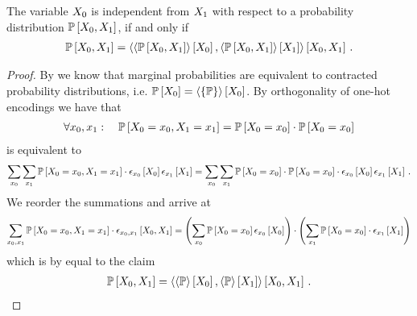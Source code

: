 \begin{theorem}
    \label{the:independenceProductCriterion}
    The variable $X_{0}$ is independent from $X_{1}$ with respect to a probability distribution $\mathbb{P}\left[X_{0},X_{1}\right]$, if and only if
    \begin{align*}
        \mathbb{P}\left[X_{0},X_{1}\right]
        = \left\langle \left\langle \mathbb{P}\left[X_{0},X_{1}\right]\right\rangle \left[ X_{0} \right],\left\langle \mathbb{P}\left[X_{0},X_{1}\right]\right\rangle \left[ X_{1} \right]\right\rangle \left[ X_{0},X_{1} \right] \, .
    \end{align*}
\end{theorem}
\begin{proof}
    By  we know that marginal probabilities are equivalent to contracted probability distributions, i.e. $\mathbb{P}\left[X_{0}\right] = \left\langle \{\mathbb{P}\}\right\rangle \left[ X_{0} \right] $.
    By orthogonality of one-hot encodings we have that
    \begin{align*}
        \forall x_{0}, x_{1} : \quad  \mathbb{P}\left[X_{0}=x_{0},X_{1}=x_{1}\right]
        = \mathbb{P}\left[X_{0}=x_{0}\right]
        \cdot
        \mathbb{P}\left[X_{0}=x_{0}\right]
    \end{align*}
    is equivalent to
    \begin{align*}
        \sum_{x_{0}}\sum_{x_{1}} \mathbb{P}\left[X_{0}=x_{0},X_{1}=x_{1}\right] \cdot \epsilon_{x_{0}}\left[X_{0}\right]\epsilon_{x_{1}}\left[X_{1}\right]
        = \sum_{x_{0}}\sum_{x_{1}}
        \mathbb{P}\left[X_{0}=x_{0}\right]
        \cdot
        \mathbb{P}\left[X_{0}=x_{0}\right] \cdot \epsilon_{x_{0}}\left[X_{0}\right]\epsilon_{x_{1}}\left[X_{1}\right] \, .
    \end{align*}
    We reorder the summations and arrive at
    \begin{align*}
        \sum_{x_{0},x_{1}}
        \mathbb{P}\left[X_{0}=x_{0},X_{1}=x_{1}\right] \cdot \epsilon_{x_{0},x_{1}}\left[X_{0}, X_{1}\right]
        = \left(\sum_{x_{0}}\mathbb{P}\left[X_{0}=x_{0}\right] \epsilon_{x_{0}}\left[X_{0}\right] \right)
        \cdot
        \left( \sum_{x_{1}}  \mathbb{P}\left[X_{0}=x_{0}\right] \cdot \epsilon_{x_{1}}\left[X_{1}\right]  \right)
    \end{align*}
    which is by  equal to the claim
    \begin{align*}
        \mathbb{P}\left[X_{0},X_{1}\right] = \left\langle \left\langle \mathbb{P}\right\rangle \left[ X_{0} \right],\left\langle \mathbb{P}\right\rangle \left[ X_{1} \right]\right\rangle \left[ X_{0},X_{1} \right] \, .
    \end{align*}
\end{proof}

